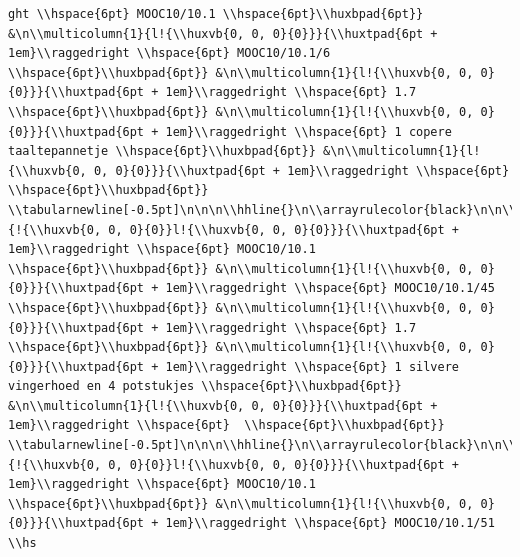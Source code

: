 \documentclass[11pt,preprint, authoryear]{elsarticle}
\numberwithin{equation}{section}
\numberwithin{figure}{section}
\numberwithin{table}{section}
\begin{document}
\begin{verbatim}
ght \\hspace{6pt} MOOC10/10.1 \\hspace{6pt}\\huxbpad{6pt}} &\n\\multicolumn{1}{l!{\\huxvb{0, 0, 0}{0}}}{\\huxtpad{6pt + 1em}\\raggedright \\hspace{6pt} MOOC10/10.1/6 \\hspace{6pt}\\huxbpad{6pt}} &\n\\multicolumn{1}{l!{\\huxvb{0, 0, 0}{0}}}{\\huxtpad{6pt + 1em}\\raggedright \\hspace{6pt} 1.7 \\hspace{6pt}\\huxbpad{6pt}} &\n\\multicolumn{1}{l!{\\huxvb{0, 0, 0}{0}}}{\\huxtpad{6pt + 1em}\\raggedright \\hspace{6pt} 1 copere taaltepannetje \\hspace{6pt}\\huxbpad{6pt}} &\n\\multicolumn{1}{l!{\\huxvb{0, 0, 0}{0}}}{\\huxtpad{6pt + 1em}\\raggedright \\hspace{6pt}  \\hspace{6pt}\\huxbpad{6pt}} \\tabularnewline[-0.5pt]\n\n\n\\hhline{}\n\\arrayrulecolor{black}\n\n\\multicolumn{1}{!{\\huxvb{0, 0, 0}{0}}l!{\\huxvb{0, 0, 0}{0}}}{\\huxtpad{6pt + 1em}\\raggedright \\hspace{6pt} MOOC10/10.1 \\hspace{6pt}\\huxbpad{6pt}} &\n\\multicolumn{1}{l!{\\huxvb{0, 0, 0}{0}}}{\\huxtpad{6pt + 1em}\\raggedright \\hspace{6pt} MOOC10/10.1/45 \\hspace{6pt}\\huxbpad{6pt}} &\n\\multicolumn{1}{l!{\\huxvb{0, 0, 0}{0}}}{\\huxtpad{6pt + 1em}\\raggedright \\hspace{6pt} 1.7 \\hspace{6pt}\\huxbpad{6pt}} &\n\\multicolumn{1}{l!{\\huxvb{0, 0, 0}{0}}}{\\huxtpad{6pt + 1em}\\raggedright \\hspace{6pt} 1 silvere vingerhoed en 4 potstukjes \\hspace{6pt}\\huxbpad{6pt}} &\n\\multicolumn{1}{l!{\\huxvb{0, 0, 0}{0}}}{\\huxtpad{6pt + 1em}\\raggedright \\hspace{6pt}  \\hspace{6pt}\\huxbpad{6pt}} \\tabularnewline[-0.5pt]\n\n\n\\hhline{}\n\\arrayrulecolor{black}\n\n\\multicolumn{1}{!{\\huxvb{0, 0, 0}{0}}l!{\\huxvb{0, 0, 0}{0}}}{\\huxtpad{6pt + 1em}\\raggedright \\hspace{6pt} MOOC10/10.1 \\hspace{6pt}\\huxbpad{6pt}} &\n\\multicolumn{1}{l!{\\huxvb{0, 0, 0}{0}}}{\\huxtpad{6pt + 1em}\\raggedright \\hspace{6pt} MOOC10/10.1/51 \\hs
\end{verbatim}
\end{document}
